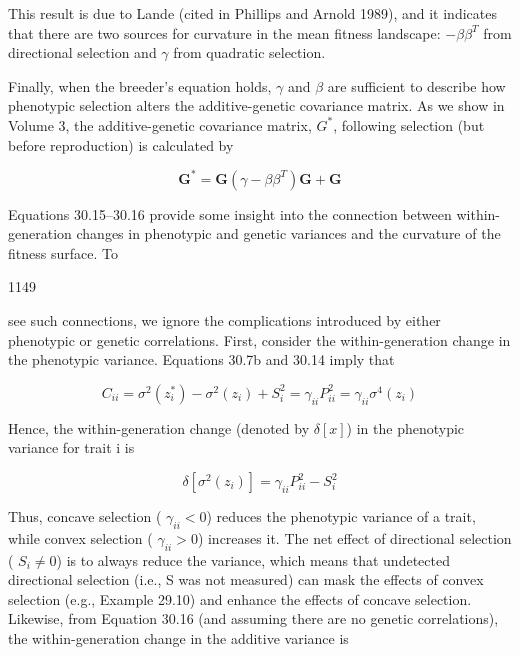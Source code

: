 \documentclass{article}
\begin{document}
This result is due to Lande (cited in Phillips and Arnold 1989), and it indicates that there are two sources for curvature in the mean fitness landscape:  $ -\beta\beta^{T} $ from directional selection and  $ \gamma $ from quadratic selection.

Finally, when the breeder’s equation holds,  $ \gamma $ and  $ \beta $ are sufficient to describe how phenotypic selection alters the additive-genetic covariance matrix. As we show in Volume 3, the additive-genetic covariance matrix,  $ G^{*} $, following selection (but before reproduction) is calculated by

\begin{equation}
\mathbf{G}^{*}=\mathbf{G}\left(\gamma-\beta\beta^{T}\right)\mathbf{G}+\mathbf{G}
\tag{30.16}
\label{eq:30_16}
\end{equation}

Equations 30.15–30.16 provide some insight into the connection between within-generation changes in phenotypic and genetic variances and the curvature of the fitness surface. To

1149

see such connections, we ignore the complications introduced by either phenotypic or genetic correlations. First, consider the within-generation change in the phenotypic variance. Equations 30.7b and 30.14 imply that

\begin{equation}
C_{ii}=\sigma^{2}(z_{i}^{*})-\sigma^{2}(z_{i})+S_{i}^{2}=\gamma_{ii}P_{ii}^{2}=\gamma_{ii}\sigma^{4}(z_{i})
\tag{30.17a}
\label{eq:30_17a}
\end{equation}

Hence, the within-generation change (denoted by  $ \delta[x] $) in the phenotypic variance for trait i is

\begin{equation}
\delta\left[\sigma^{2}(z_{i})\right]=\gamma_{i i}P_{i i}^{2}-S_{i}^{2}
\tag{30.17b}
\label{eq:30_17b}
\end{equation}

Thus, concave selection ( $ \gamma_{ii} < 0 $) reduces the phenotypic variance of a trait, while convex selection ( $ \gamma_{ii} > 0 $) increases it. The net effect of directional selection ( $ S_i \neq 0 $) is to always reduce the variance, which means that undetected directional selection (i.e., S was not measured) can mask the effects of convex selection (e.g., Example 29.10) and enhance the effects of concave selection. Likewise, from Equation 30.16 (and assuming there are no genetic correlations), the within-generation change in the additive variance is
\end{document}
